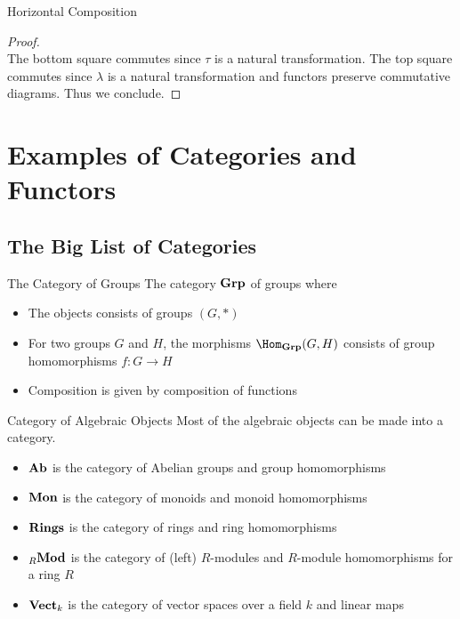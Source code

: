 \documentclass[a4paper]{article}
\begin{document}
\begin{prp}{Horizontal Composition}{}
\begin{proof}
{}\\
The bottom square commutes since $\tau$ is a natural transformation. The top square commutes since $\lambda$ is a natural transformation and functors preserve commutative diagrams. Thus we conclude. 
\end{proof}
\end{prp}


\pagebreak
\section{Examples of Categories and Functors}
\subsection{The Big List of Categories}
\begin{defn}{The Category of Groups}{} The category $\bold{Grp}$ of groups where 
\begin{itemize}
\item The objects consists of groups $(G,\ast)$
\item For two groups $G$ and $H$, the morphisms $\Hom_\bold{Grp}(G,H)$ consists of group homomorphisms $f:G\to H$
\item Composition is given by composition of functions
\end{itemize}
\end{defn}

\begin{defn}{Category of Algebraic Objects}{} Most of the algebraic objects can be made into a category. 
\begin{itemize}
\item $\bold{Ab}$ is the category of Abelian groups and group homomorphisms
\item $\bold{Mon}$ is the category of monoids and monoid homomorphisms
\item $\bold{Rings}$ is the category of rings and ring homomorphisms
\item ${_R}\bold{Mod}$ is the category of (left) $R$-modules and $R$-module homomorphisms for a ring $R$
\item $\bold{Vect}_k$ is the category of vector spaces over a field $k$ and linear maps
\end{itemize}
\end{defn}
\end{document}
